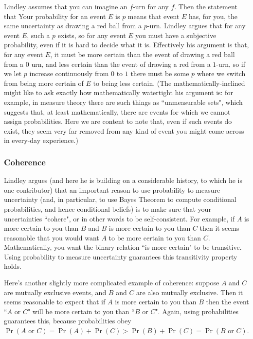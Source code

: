 \documentclass{article}[11pt]
\begin{document}
Lindley assumes that you can imagine an $f$-urn for any $f$. Then the statement that Your probability for an event $E$ is $p$ means that event $E$ has, for you, the same uncertainty as drawing a red ball from a $p$-urn. Lindley argues that for any event $E$, such a $p$ exists, so for any event $E$ you must have a subjective probability, even if it is hard to decide what it is. Effectively his argument is that, for any event $E$, it must be more certain than the event of drawing a red ball from a $0$ urn, and less certain than the event of drawing a red from a $1$-urn, so if we let $p$ increase continuously from $0$ to $1$ there must be some $p$ where we switch from being more certain of $E$ to being less certain. (The mathematically-inclined might like to ask exactly how mathematically watertight his argument is: for example, in measure theory there are such things as ``unmeasurable sets", which suggests that, at least mathematically, there are events for which we cannot assign probabilities. Here we are content to note that, even if such events do exist, they seem very far removed from any kind of event you might come across in every-day experience.)

\subsubsection{Coherence}

Lindley argues (and here he is building on a considerable history, to which he is one contributor)
that an important reason to use probability to measure uncertainty (and, in particular, to use
Bayes Theorem to compute conditional probabilities,
and hence conditional beliefs) is to make sure that your uncertainties ``cohere", or in other words to be self-consistent. For example, if $A$ is more certain to you than $B$ and $B$ is more certain to you than $C$ then it seems reasonable that you would want $A$ to be more certain to you than $C$. Mathematically, you want the binary relation ``is more certain" to be transitive. Using probability to measure uncertainty guarantees this transitivity property holds.

Here's another slightly more complicated example of coherence: suppose $A$ and $C$ are mutually exclusive events, and $B$ and $C$ are also mutually exclusive. Then it seems reasonable to expect that if $A$ is more certain to you than $B$ then the event ``$A$ or $C$" will be more certain to you than ``$B$ or $C$". Again, using probabilities guarantees this, because probabilities obey $\Pr(A \text{ or } C) = \Pr(A)+\Pr(C) > \Pr(B) + \Pr(C) = \Pr(B \text{ or } C)$.
\end{document}
